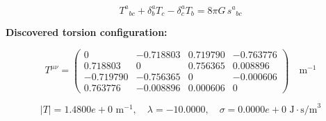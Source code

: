 
\begin{equation}
  T^a{}_{bc} + \delta^a_b T_c - \delta^a_c T_b = 8\pi G \, s^a{}_{bc}
\end{equation}

\textbf{Discovered torsion configuration:}

\begin{equation}
  T^{\mu\nu} = \begin{pmatrix}
    0 & -0.718803 & 0.719790 & -0.763776 \\
    0.718803 & 0 & 0.756365 & 0.008896 \\
    -0.719790 & -0.756365 & 0 & -0.000606 \\
    0.763776 & -0.008896 & 0.000606 & 0
  \end{pmatrix} \quad \text{m}^{-1}
\end{equation}

\begin{equation}
  |T| = 1.4800e+0 \text{ m}^{-1}, \quad
  \lambda = -10.0000, \quad
  \sigma = 0.0000e+0 \text{ J}\cdot\text{s/m}^3
\end{equation}